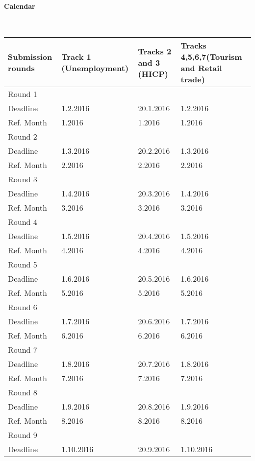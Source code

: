 \documentclass[12pt]{article}
\begin{document}
\paragraph{Calendar}

\textbf{ }\\

\begin{longtable}{ | p{3cm} | p{3cm}| p{3cm}| p{3cm}| }
\hline
Submission rounds & Track 1 \newline (Unemployment) & Tracks 2 and 3 (HICP) & Tracks 4,5,6,7\newline(Tourism and Retail trade) \\
\hline
Round 1&  & &  \\
Deadline  & 1.2.2016 & 20.1.2016 & 1.2.2016 \\
Ref. Month& 1.2016 & 1.2016 & 1.2016 \\
\hline
Round 2&  & &  \\
Deadline  & 1.3.2016 & 20.2.2016 & 1.3.2016 \\
Ref. Month& 2.2016 & 2.2016 & 2.2016 \\
\hline
Round 3&  & &  \\
Deadline  & 1.4.2016 & 20.3.2016 & 1.4.2016 \\
Ref. Month& 3.2016 & 3.2016 & 3.2016 \\
\hline
Round 4&  & &  \\
Deadline  & 1.5.2016 & 20.4.2016 & 1.5.2016 \\
Ref. Month& 4.2016 & 4.2016 & 4.2016 \\
\hline
Round 5&  & &  \\
Deadline  & 1.6.2016 & 20.5.2016 & 1.6.2016 \\
Ref. Month& 5.2016 & 5.2016 & 5.2016 \\
\hline
Round 6&  & &  \\
Deadline  & 1.7.2016 & 20.6.2016 & 1.7.2016 \\
Ref. Month& 6.2016 & 6.2016 & 6.2016 \\
\hline
Round 7&  & &  \\
Deadline  & 1.8.2016 & 20.7.2016 & 1.8.2016 \\
Ref. Month& 7.2016 & 7.2016 & 7.2016 \\
\hline
Round 8&  & &  \\
Deadline  & 1.9.2016 & 20.8.2016 & 1.9.2016 \\
Ref. Month& 8.2016 & 8.2016 & 8.2016 \\
\hline
Round 9&  & &  \\
Deadline  & 1.10.2016 & 20.9.2016 & 1.10.2016 \\

\end{longtable}
\end{document}

